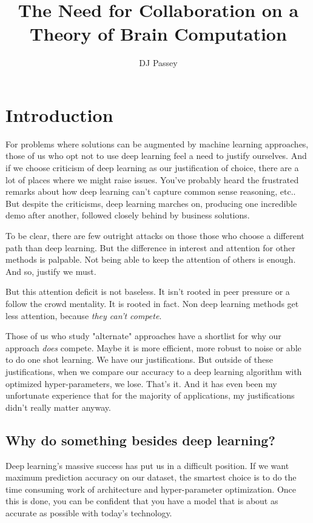\documentclass{article}
\begin{document}
\title{The Need for Collaboration on a Theory of Brain Computation}
\author{DJ Passey}
\maketitle

\section*{Introduction}
For problems where solutions can be augmented by machine learning approaches, those of us who opt not to use deep learning feel a need to justify ourselves. And if we choose criticism of deep learning as our justification of choice, there are a lot of places where we might raise issues. You've probably heard the frustrated remarks about how deep learning can't capture common sense reasoning, etc.. But despite the criticisms, deep learning marches on, producing one incredible demo after another, followed closely behind by business solutions.

To be clear, there are few outright attacks on those those who choose a different path than deep learning. But the difference in interest and attention for other methods is palpable. Not being able to keep the attention of others is enough. And so, justify we must.

But this attention deficit is not baseless. It isn't rooted in peer pressure or a follow the crowd mentality. It is rooted in fact. Non deep learning methods get less attention, because \textit{they can't compete}.

Those of us who study "alternate" approaches have a shortlist for why our approach \textit{does} compete. Maybe it is more efficient, more robust to noise or able to do one shot learning. We have our justifications. But outside of these justifications, when we compare our accuracy to a deep learning algorithm with optimized hyper-parameters, we lose. That's it. And it has even been my unfortunate experience that for the majority of applications, my justifications didn't really matter anyway.

\subsection*{Why do something besides deep learning?}
Deep learning's massive success has put us in a difficult position. If we want maximum prediction accuracy on our dataset, the smartest choice is to do the time consuming work of architecture and hyper-parameter optimization. Once this is done, you can be confident  that you have a model that is about as accurate as possible with today's technology.
\end{document}

